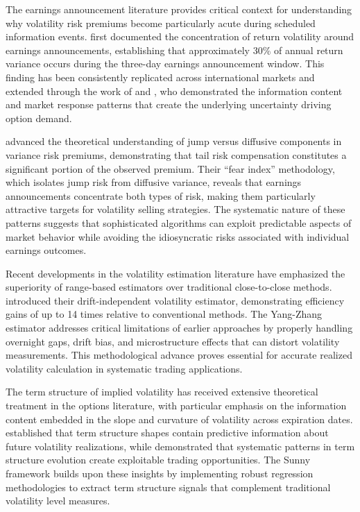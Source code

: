 \documentclass[
  american,
  11pt,
  11pt,
  letterpaper,
  onecolumn]{article}
\begin{document}
The earnings announcement literature provides critical context for
understanding why volatility risk premiums become particularly acute
during scheduled information events. \textcite{patell1979} first
documented the concentration of return volatility around earnings
announcements, establishing that approximately 30\% of annual return
variance occurs during the three-day earnings announcement window. This
finding has been consistently replicated across international markets
and extended through the work of \textcite{beaver1968} and
\textcite{ball1968}, who demonstrated the information content and market
response patterns that create the underlying uncertainty driving option
demand.

\textcite{bollerslev2011} advanced the theoretical understanding of jump
versus diffusive components in variance risk premiums, demonstrating
that tail risk compensation constitutes a significant portion of the
observed premium. Their ``fear index'' methodology, which isolates jump
risk from diffusive variance, reveals that earnings announcements
concentrate both types of risk, making them particularly attractive
targets for volatility selling strategies. The systematic nature of
these patterns suggests that sophisticated algorithms can exploit
predictable aspects of market behavior while avoiding the idiosyncratic
risks associated with individual earnings outcomes.

Recent developments in the volatility estimation literature have
emphasized the superiority of range-based estimators over traditional
close-to-close methods. \textcite{yang2000} introduced their
drift-independent volatility estimator, demonstrating efficiency gains
of up to 14 times relative to conventional methods. The Yang-Zhang
estimator addresses critical limitations of earlier approaches by
properly handling overnight gaps, drift bias, and microstructure effects
that can distort volatility measurements. This methodological advance
proves essential for accurate realized volatility calculation in
systematic trading applications.

The term structure of implied volatility has received extensive
theoretical treatment in the options literature, with particular
emphasis on the information content embedded in the slope and curvature
of volatility across expiration dates. \textcite{christoffersen2013}
established that term structure shapes contain predictive information
about future volatility realizations, while \textcite{trolle2009}
demonstrated that systematic patterns in term structure evolution create
exploitable trading opportunities. The Sunny framework builds upon these
insights by implementing robust regression methodologies to extract term
structure signals that complement traditional volatility level measures.
\end{document}
